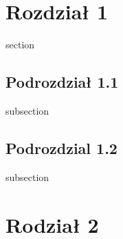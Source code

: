 \documentclass{article}
\begin{document}
\tableofcontents
\newpage

\section{Rozdział 1}
section

\subsection{Podrozdział 1.1}
subsection

\subsection{Podrozdzial 1.2}
subsection
\newpage

\section{Rodział 2}
\end{document}
